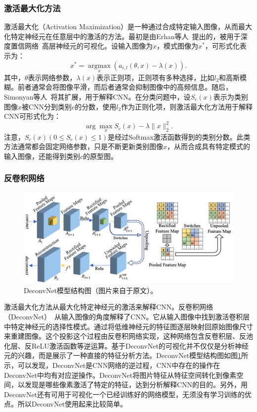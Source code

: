 \subsubsection{激活最大化方法}
激活最大化（Activation Maximization）是一种通过合成特定输入图像，从而最大化特定神经元在任意层中的激活的方法。最初是由Erhan等人~\cite{erhan2009visualizing}提出的，被用于深度置信网络~\cite{hinton2006fast}高层神经元的可视化。设输入图像为$x$，模式图像为$x^*$，可形式化表示为：
\begin{equation*}
x^{*}=\underset{x}{\operatorname{argmax}}\left(a_{i, l}(\theta, x)-\lambda(x)\right).
\end{equation*}
其中，$\theta$表示网络参数，$\lambda(x)$表示正则项，正则项有多种选择，比如$l_2$和高斯模糊。前者通常会将图像平滑，而后者通常会抑制图像中的高频信息。随后，Simonyan等人~\cite{simonyan2013deep}将其扩展，用于解释CNN。在分类问题中，设$S_{c}(x)$表示为类别图像$x$被CNN分到类别$c$的分数，使用$l_2$作为正则化项，则激活最大化方法用于解释CNN可形式化为：
\begin{equation*}
\arg \max _{x} S_{c}(x)-\lambda\|x\|_{2}^{2}.
\end{equation*}
注意，$S_{c}(x)(0\leq S_{c}(x) \leq 1)$是经过Softmax激活函数得到的类别分数。此类方法通常都会固定网络参数，只是不断更新类别图像$x$，从而合成具有特定模式的输入图像，还能得到类别$c$的原型图。
\subsubsection{反卷积网络}
\begin{figure}[h]
	\centering
	\includegraphics[width=1.0\textwidth]{figure/deconvnet_architecture}
	\caption{DeconvNet模型结构图（图片来自于原文）。}
	\label{fig:deconvnet_architecture}
\end{figure}
激活最大化方法从最大化特定神经元的激活来解释CNN。反卷积网络（DeconvNet）~\cite{zeiler2014visualizing, zeiler2010deconvolutional, zeiler2011adaptive}从输入图像的角度解释了CNN。它从输入图像中找到激活卷积层中特定神经元的选择性模式。通过将低维神经元的特征图逐层映射回原始图像尺寸来重建图像。这个投影这个过程由反卷积网络实现，这种网络包含反卷积层、反池化层、反ReLU激活函数等逆运算。基于DeconvNet的可视化并不仅仅是分析神经元的兴趣，而是展示了一种直接的特征分析方法。DeconvNet模型结构图如图\ref{fig:deconvnet_architecture}所示，可以发现，DeconvNet是CNN网络的逆过程，CNN中存在的操作在DeconvNet中均有对应逆操作。DeconvNet将图片特征从特征空间转化到像素空间，以发现是哪些像素激活了特定的特征，达到分析解释CNN的目的。另外，用DeconvNet还有可用于可视化一个已经训练好的网络模型，无须没有学习训练的优点。所以DeconvNet使用起来比较简单。

